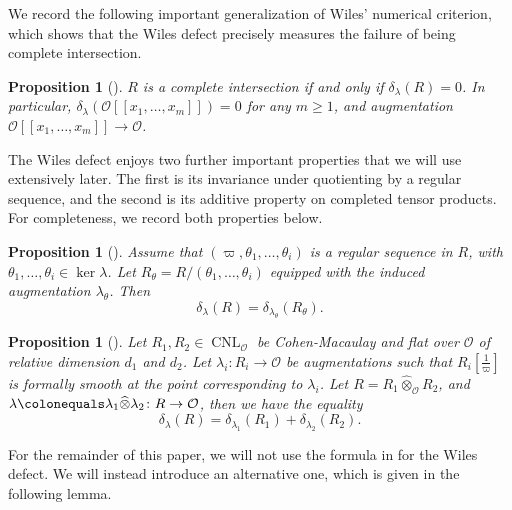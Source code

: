 \documentclass[a4paper, notitlepage, 10pt]{amsart}
\theoremstyle{plain} %
\newtheorem{proposition}[theorem]{Proposition}
\theoremstyle{definition} %
\theoremstyle{remark} %
\numberwithin{equation}{section}
\newcommand{\CNL}{\operatorname{CNL}}
\begin{document}
We record the following important generalization of Wiles' numerical criterion, which shows that the Wiles defect precisely measures the failure of being complete intersection.
\begin{proposition}[{\cite[Proposition 3.28]{BKM2}}]\label{WDcompleteIntersection}
      $R$ is a complete intersection if and only if $\delta_{\lambda}(R)=0$. In particular, $\delta_{\lambda}(\mathcal{O}[[x_1,\dots,x_m]])=0$ for any $m\ge 1$, and augmentation $\mathcal{O}[[x_1,\dots,x_m]]\to \mathcal{O}$.
\end{proposition}

The Wiles defect enjoys two further important properties that we will use extensively later. The first is its invariance under quotienting by a regular sequence, and the second is its additive property on completed tensor products. For completeness, we record both properties below.
\begin{proposition}[{\cite[Theorem 3.29]{BKM2}}]\label{invunderregseq}
   Assume that $(\varpi,\theta_1,\dots,\theta_i)$ is a regular sequence in $R$, with $\theta_1,\dots,\theta_i\in \ker \lambda$. Let $R_{\theta}=R/(\theta_1,\dots,\theta_i)$ equipped with the induced augmentation $\lambda_{\theta}$. Then 
    $$ \delta_\lambda(R)=\delta_{\lambda_{\theta}}(R_{\theta}). $$
\end{proposition}

\begin{proposition}[{\cite[Proposition 3.30]{BKM2}}]\label{invtensorprod}
    Let $R_1,R_2\in \CNL_{\mathcal{O}}$ be Cohen-Macaulay and flat over $\mathcal{O}$ of relative dimension $d_1$ and $d_2$. Let $\lambda_i\colon R_i\to \mathcal{O}$ be augmentations such that $R_i[\tfrac{1}{\varpi}]$ is formally smooth at the point corresponding to $\lambda_i$. Let $R=R_1\widehat{\otimes}_{\mathcal{O}}R_2$, and $\lambda\colonequals \lambda_1\widehat{\otimes}\lambda_2 \colon R\to \mathcal{O}$, then we have the equality
    $$ \delta_{\lambda}(R)=\delta_{\lambda_1}(R_1)+\delta_{\lambda_2}(R_2).$$
\end{proposition}

For the remainder of this paper, we will not use the formula in  for the Wiles defect. We will instead introduce an alternative one, which is given in the following lemma.
\end{document}
